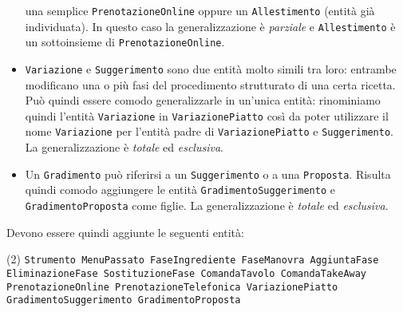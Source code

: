 \begin{itemize}
    una semplice {\tt PrenotazioneOnline} oppure un {\tt Allestimento} (entità già individuata).
    In questo caso la generalizzazione è {\it parziale} e {\tt Allestimento}
    è un sottoinsieme di {\tt PrenotazioneOnline}.
\item {\tt Variazione} e {\tt Suggerimento} sono due entità molto simili tra loro: entrambe
    modificano una o più fasi del procedimento strutturato di una certa ricetta. Può quindi
    essere comodo generalizzarle in un'unica entità: rinominiamo quindi l'entità {\tt Variazione}
    in {\tt VariazionePiatto} così da poter utilizzare il nome {\tt Variazione} per l'entità
    padre di {\tt VariazionePiatto} e {\tt Suggerimento}. La generalizzazione è {\it totale}
    ed {\it esclusiva}.
\item Un {\tt Gradimento} può riferirsi a un {\tt Suggerimento} o a una {\tt Proposta}.
    Risulta quindi comodo aggiungere le entità {\tt GradimentoSuggerimento} e
    {\tt GradimentoProposta} come figlie. La generalizzazione è {\it totale} ed
    {\it esclusiva}.
\end{itemize}

Devono essere quindi aggiunte le seguenti entità:
\begin{tasks}[label=\textbullet](2)
    \task\tt Strumento
    \task\tt MenuPassato
    \task\tt FaseIngrediente
    \task\tt FaseManovra
    \task\tt AggiuntaFase
    \task\tt EliminazioneFase
    \task\tt SostituzioneFase
    \task\tt ComandaTavolo
    \task\tt ComandaTakeAway
    \task\tt PrenotazioneOnline
    \task\tt PrenotazioneTelefonica
    \task\tt VariazionePiatto
    \task\tt GradimentoSuggerimento
    \task\tt GradimentoProposta
\end{tasks}
